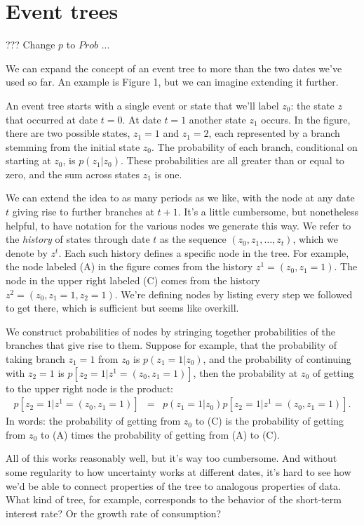 \documentclass[11pt]{article}
\begin{document}
\section{Event trees}

??? Change $p$ to $Prob$ ...

We can expand the concept of an event tree to more than the two
dates we've used so far.
An example is Figure 1, but we can imagine extending it further.

An event tree starts with a single event or state that we'll label $z_0$:
the state $z$ that occurred at date $t=0$.
At date $t=1$ another state $z_1$ occurs.
In the figure, there are two possible states, $z_1 = 1$ and $z_1 = 2$,
each represented by a branch stemming from the initial state $z_0$.
The probability of each branch, conditional on starting at $z_0$,
is $p(z_1| z_0)$. These probabilities are all greater than or equal to zero,
and the sum across states $z_1$ is one.

We can extend the idea to as many periods as we like,
with the node at any date $t$ giving rise to further branches at $t+1$.
It's a little cumbersome, but nonetheless helpful,
to have notation for the various nodes we generate this way.
We refer to the {\it history\/} of states through date $t$
as the sequence $(z_0, z_1, \ldots, z_t)$, which we denote by $z^t$.
Each such history defines a specific node in the tree.
For example, the node labeled (A) in the figure comes from the history
$z^1 = (z_0, z_1 = 1)$.
The node in the upper right labeled (C)
comes from the history $z^2 = (z_0, z_1 = 1, z_2 = 1)$.
We're defining nodes by listing every step we followed to get there,
which is sufficient but seems like overkill.

We construct probabilities of nodes by stringing together probabilities
of the branches that give rise to them.
Suppose for example, that the probability of
taking branch $z_1=1$ from $z_0$ is $p(z_1=1| z_0)$,
and the probability of continuing with $z_2 = 1$ is $p[z_2=1 | z^1 = (z_0, z_1=1) ]$,
then the probability at $z_0$ of getting to the upper right node is the product:
\begin{eqnarray*}
    p[z_2=1 | z^1 = (z_0, z_1=1) ] &=& p(z_1=1| z_0) p[z_2=1 | z^1 = (z_0, z_1=1) ] .
\end{eqnarray*}
In words:  the probability of getting from $z_0$ to (C)
is the probability of getting from $z_0$ to (A)
times the probability of getting from (A) to (C).

All of this works reasonably well, but it's way too cumbersome.
And without some regularity to how uncertainty works at different dates,
it's hard to see how we'd be able to connect properties of the tree
to analogous properties of data.
What kind of tree, for example, corresponds to the behavior of the short-term
interest rate?  Or the growth rate of consumption?
\end{document}
